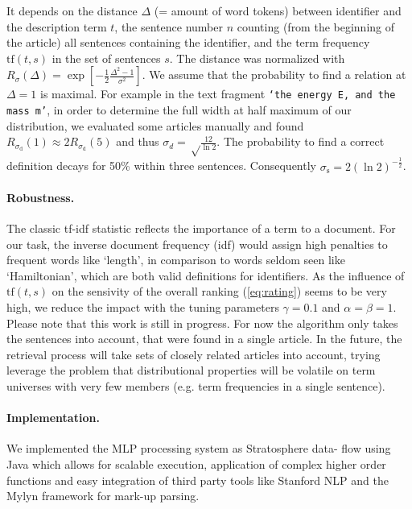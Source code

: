 \documentclass[runningheads]{llncs}
\begin{document}
It depends on the distance $\Delta$ (= amount of word tokens) between
identifier and the description term $t$, the sentence number $n$ counting
(from the beginning of the article) all sentences containing the identifier,
and the term frequency $\mathrm{tf}(t,s)$ in the set of sentences $s$. The
distance was normalized with $R_\sigma(\Delta) = \exp\left[ -\frac{1}{2}
\frac{\Delta^2-1}{\sigma^2}\right].$ We assume that the probability to find a
relation at $\Delta=1$ is maximal. For example in the text fragment
\texttt{`the energy E, and the mass m'}, in order to determine the full width
at half maximum of our distribution, we evaluated some articles manually and
found $R_{\sigma_\mathrm d}(1)\approx 2 R_{\sigma_\mathrm d}(5)$ and thus
$\sigma_d=\sqrt\frac{12}{\ln 2}$. The probability to find a correct definition
decays for 50\% within three sentences. Consequently $\sigma_\mathrm
s=2\left({\ln 2}\right)^{-\frac{1}{2}}$.


\paragraph{Robustness.}

The classic tf-idf \cite{Salton86} statistic reflects the importance of a term
to a document. For our task, the inverse document frequency (idf) would assign
high penalties to frequent words like `length', in comparison to words seldom
seen like `Hamiltonian', which are both valid definitions for identifiers. As the
influence of $\mathrm{tf}(t,s)$ on the sensivity of the overall ranking
(\ref{eq:rating}) seems to be very high, we reduce the impact with the tuning
parameters $\gamma=0.1$ and $\alpha = \beta = 1$. Please note that this work
is still in progress. For now the algorithm only takes the sentences into
account, that were found in a single article. In the future, the retrieval
process will take sets of closely related articles into account, trying
leverage the problem that distributional properties will be volatile on term
universes with very few members (e.g. term frequencies in a single sentence).


\paragraph{Implementation.}

We implemented the MLP processing system \cite{github} as Stratosphere data-
flow using Java which allows for scalable execution, application of complex
higher order functions and easy integration of third party tools like Stanford
NLP and the Mylyn framework for mark-up parsing.
\end{document}
